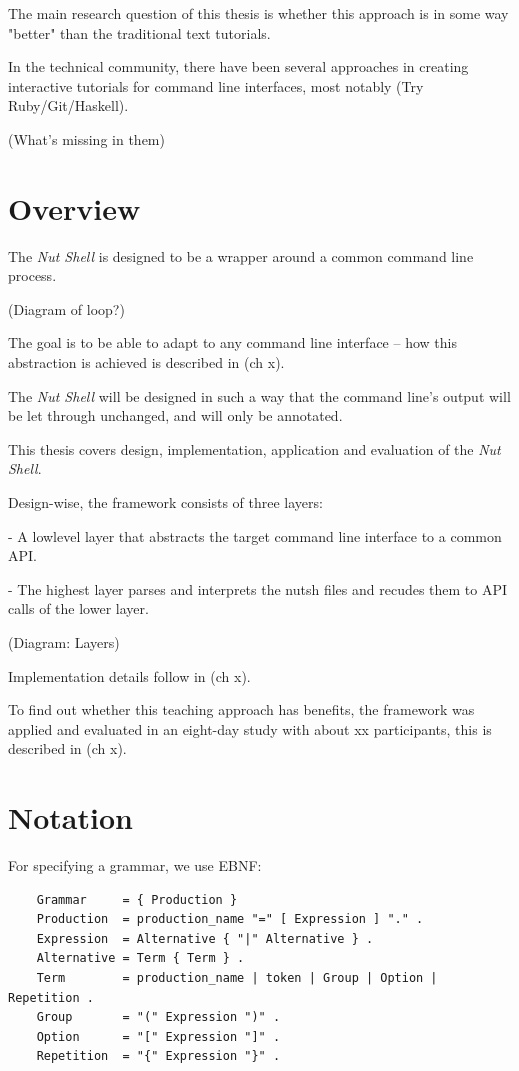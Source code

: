\documentclass[paper=a4,abstract=on,cleardoublepage=empty,numbers=noenddot,toc=bib]{scrreprt}
\begin{document}
The main research question of this thesis is whether this approach is in some way "better" than the traditional text tutorials.

In the technical community, there have been several approaches in creating interactive tutorials for command line interfaces, most notably (Try Ruby/Git/Haskell).

(What's missing in them)

\section{Overview}

The \emph{Nut Shell} is designed to be a wrapper around a common command line process.

(Diagram of loop?)

The goal is to be able to adapt to any command line interface -- how this abstraction is achieved is described in (ch x).

The \emph{Nut Shell} will be designed in such a way that the command line's output will be let through unchanged, and will only be annotated.

This thesis covers design, implementation, application and evaluation of the \emph{Nut Shell}.

Design-wise, the framework consists of three layers:

- A lowlevel layer that abstracts the target command line interface to a common API.

- The highest layer parses and interprets the nutsh files and recudes them to API calls of the lower layer.

(Diagram: Layers)

Implementation details follow in (ch x).

To find out whether this teaching approach has benefits, the framework was applied and evaluated in an eight-day study with about xx participants, this is described in (ch x).

\section{Notation}

For specifying a grammar, we use EBNF:

\begin{lstlisting}
    Grammar     = { Production }
    Production  = production_name "=" [ Expression ] "." .
    Expression  = Alternative { "|" Alternative } .
    Alternative = Term { Term } .
    Term        = production_name | token | Group | Option | Repetition .
    Group       = "(" Expression ")" .
    Option      = "[" Expression "]" .
    Repetition  = "{" Expression "}" .
\end{lstlisting}
\end{document}
